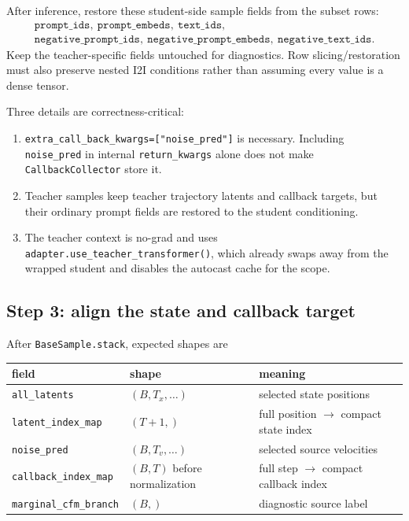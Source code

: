 \documentclass[11pt,a4paper]{article}
\theoremstyle{plain}
\theoremstyle{definition}
\begin{document}
After inference, restore these student-side sample fields from the subset rows:
\[
\begin{gathered}
\texttt{prompt\_ids},\ \texttt{prompt\_embeds},\ \texttt{text\_ids},\\
\texttt{negative\_prompt\_ids},\
\texttt{negative\_prompt\_embeds},\
\texttt{negative\_text\_ids}.
\end{gathered}
\]
Keep the teacher-specific fields untouched for diagnostics.  Row slicing/restoration must also
preserve nested I2I conditions rather than assuming every value is a dense tensor.

Three details are correctness-critical:
\begin{enumerate}[leftmargin=1.6em]
\item \texttt{extra\_call\_back\_kwargs=["noise\_pred"]} is necessary.  Including
      \texttt{noise\_pred} in internal \texttt{return\_kwargs} alone does not make
      \texttt{CallbackCollector} store it.
\item Teacher samples keep teacher trajectory latents and callback targets, but their ordinary
      prompt fields are restored to the student conditioning.
\item The teacher context is no-grad and uses
      \texttt{adapter.use\_teacher\_transformer()}, which already swaps away from the wrapped
      student and disables the autocast cache for the scope.
\end{enumerate}

\subsection{Step 3: align the state and callback target}

After \texttt{BaseSample.stack}, expected shapes are
\begin{center}
\begin{tabular}{@{}lll@{}}
\toprule
field & shape & meaning\\
\midrule
\texttt{all\_latents} & $(B,T_x,\ldots)$ & selected state positions\\
\texttt{latent\_index\_map} & $(T+1,)$ & full position $\to$ compact state index\\
\texttt{noise\_pred} & $(B,T_v,\ldots)$ & selected source velocities\\
\texttt{callback\_index\_map} & $(B,T)$ before normalization & full step $\to$ compact callback index\\
\texttt{marginal\_cfm\_branch} & $(B,)$ & diagnostic source label\\
\bottomrule
\end{tabular}
\end{center}
\end{document}
